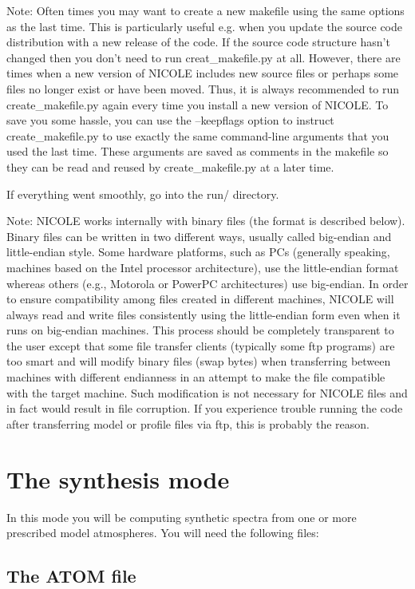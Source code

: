 Note: Often times you may want to create a new makefile using the same
options as the last time. This is particularly useful e.g. when you
update the source code distribution with a new release of the code. If
the source code structure hasn't changed then you don't need to run
creat\_makefile.py at all. However, there are times when a new version
of NICOLE includes new source files or perhaps some files no longer
exist or have been moved. Thus, it is always recommended to run 
create\_makefile.py again every time you install a new version of NICOLE.
To save you some hassle, you can use the --keepflags option to instruct
create\_makefile.py to use exactly the same command-line arguments that
you used the last time. These arguments are saved as comments in the
makefile so they can be read and reused by create\_makefile.py at a later
time.

If everything went smoothly, go into the run/ directory.

Note: NICOLE works internally with binary files (the format is
described below). Binary files can be written in two different ways,
usually called big-endian and little-endian style. Some hardware
platforms, such as PCs (generally speaking, machines based on the
Intel processor architecture), use the little-endian format whereas
others (e.g., Motorola or PowerPC architectures) use big-endian. In
order to ensure compatibility among files created in different
machines, NICOLE will always read and write files consistently using
the little-endian form even when it runs on big-endian machines. This
process should be completely transparent to the user except that some
file transfer clients (typically some ftp programs) are too smart and
will modify binary files (swap bytes) when transferring between
machines with different endianness in an attempt to make the file
compatible with the target machine. Such modification is not necessary
for NICOLE files and in fact would result in file corruption. If you
experience trouble running the code after transferring model or
profile files via ftp, this is probably the reason.

\section{The synthesis mode}
\label{synthmode}

In this mode you will be computing synthetic spectra from one or more
prescribed model atmospheres. You will need the following files:

\subsection{The ATOM file}

